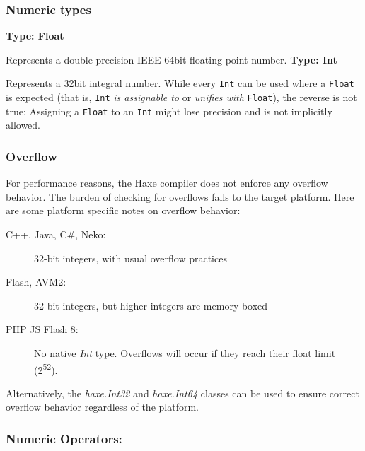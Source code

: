 \documentclass{article}
\newcommand{\type}[1]{\texttt{#1}}
\newenvironment{myshaded}
  {\def\FrameCommand{\fboxsep=\topsep\colorbox{bgcolor}}%
  \MakeFramed {\advance\hsize-\width \FrameRestore}}%
 {\endMakeFramed}
\newcommand{\define}[3][Definition]
	{\begin{myshaded}\noindent\textbf{#1: #2}\par\nobreak\noindent\ignorespaces#3\label{def:#2}\end{myshaded}}
\begin{document}
\subsubsection{Numeric types}
\label{Numeric types}

\define[Type]{Float}{Represents a double-precision IEEE 64bit floating point number.}
\define[Type]{Int}{Represents a 32bit integral number.}
While every \type{Int} can be used where a \type{Float} is expected (that is, \type{Int} \emph{is assignable to} or \emph{unifies with} \type{Float}), the reverse is not true: Assigning a \type{Float} to an \type{Int} might lose precision and is not implicitly allowed.

\subsubsection{Overflow}
\label{Overflow}
For performance reasons, the Haxe compiler does not enforce any overflow behavior.  The burden of checking for overflows falls to the target platform. Here are some platform specific notes on overflow behavior:

\begin{description}
 \item[C++, Java, C\#, Neko:] 32-bit integers, with usual overflow practices 
 \item[Flash, AVM2:] 32-bit integers, but higher integers are memory boxed
 \item[PHP JS Flash 8:] No native \emph{Int} type.  Overflows will occur if they reach their float limit (2\textsuperscript{52}).
\end{description}

Alternatively, the \emph{haxe.Int32} and \emph{haxe.Int64} classes can be used to ensure correct overflow behavior regardless of the platform.  

\subsubsection{Numeric Operators:}
\end{document}
